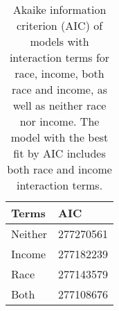 \begin{table}[ht]
\centering
\begin{tabular}{| l | l |}
\hline
Terms & AIC \\
\hline
Neither & 277270561 \\
Income  & 277182239 \\
Race    & 277143579 \\
Both    & 277108676 \\
\hline
\end{tabular}
\caption{\label{tab:aics} Akaike information criterion (AIC) of models with interaction terms for race, income, both race and income, as well as neither race nor income.  The model with the best fit by AIC includes both race and income interaction terms.}
\end{table}

